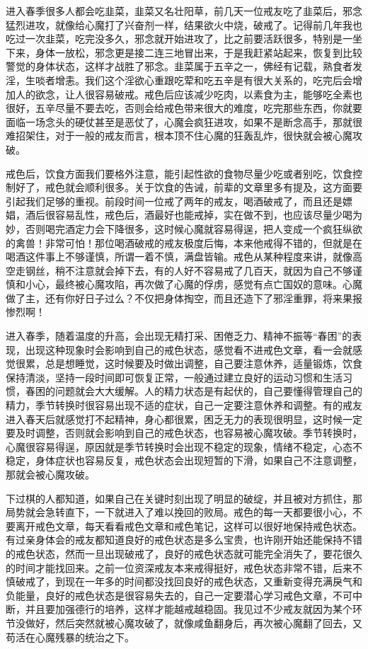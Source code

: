 进入春季很多人都会吃韭菜，韭菜又名壮阳草，前几天一位戒友吃了韭菜后，邪念猛烈进攻，就像给心魔打了兴奋剂一样，结果欲火中烧，破戒了。记得前几年我也吃过一次韭菜，吃完没多久，邪念就开始进攻了，比之前要活跃很多，特别是一坐下来，身体一放松，邪念更是接二连三地冒出来，于是我赶紧站起来，恢复到比较警觉的身体状态，这样才战胜了邪念。韭菜属于五辛之一，佛经有记载，熟食者发淫，生啖者增恚。我们这个淫欲心重跟吃荤和吃五辛是有很大关系的，吃完后会增加人的欲念，让人很容易破戒。戒色后应该减少吃肉，以素食为主，能够吃全素也很好，五辛尽量不要去吃，否则会给戒色带来很大的难度，吃完那些东西，你就要面临一场念头的硬仗甚至是恶仗了，心魔会疯狂进攻，如果不是断念高手，那就很难招架住，对于一般的戒友而言，根本顶不住心魔的狂轰乱炸，很快就会被心魔攻破。

戒色后，饮食方面我们要格外注意，能引起性欲的食物尽量少吃或者别吃，饮食控制好了，戒色就会顺利很多。关于饮食的告诫，前辈的文章里多有提及，这方面要引起我们足够的重视。前段时间一位戒了两年的戒友，喝酒破戒了，而且还是嫖娼，酒后很容易乱性，戒色后，酒最好也能戒掉，实在做不到，也应该尽量少喝为妙，否则喝完酒定力会下降很多，这时候心魔就容易得逞，把人变成一个疯狂纵欲的禽兽！非常可怕！那位喝酒破戒的戒友极度后悔，本来他戒得不错的，但就是在喝酒这件事上不够谨慎，所谓一着不慎，满盘皆输。戒色从某种程度来讲，就像高空走钢丝，稍不注意就会掉下去，有的人好不容易戒了几百天，就因为自己不够谨慎和小心，最终被心魔攻陷，再次做了心魔的俘虏，感觉有点亡国奴的意味。心魔做了主，还有你好日子过么？不仅把身体掏空，而且还造下了邪淫重罪，将来果报惨烈啊！

进入春季，随着温度的升高，会出现无精打采、困倦乏力、精神不振等“春困”的表现，出现这种现象时会影响到自己的戒色状态，感觉看不进戒色文章，看一会就感觉很累，总是想睡觉，这时候要及时做出调整，自己要注意休养，适量锻炼，饮食保持清淡，坚持一段时间即可恢复正常，一般通过建立良好的运动习惯和生活习惯，春困的问题就会大大缓解。人的精力状态是有起伏的，自己要懂得管理自己的精力，季节转换时很容易出现不适的症状，自己一定要注意休养和调整。有的戒友进入春天后就感觉打不起精神，身心都很累，困乏无力的表现很明显，这时候一定要及时调整，否则就会影响到自己的戒色状态，也容易被心魔攻破。季节转换时，心魔很容易得逞，原因就是季节转换时会出现不稳定的现象，情绪不稳定，心态不稳定，身体症状也容易反复，戒色状态会出现短暂的下滑，如果自己不注意调整，那就会被心魔攻破。

下过棋的人都知道，如果自己在关键时刻出现了明显的破绽，并且被对方抓住，那局势就会急转直下，一下就进入了难以挽回的败局。戒色的每一天都要很小心，不要离开戒色文章，每天看看戒色文章和戒色笔记，这样可以很好地保持戒色状态。有过亲身体会的戒友都知道良好的戒色状态是多么宝贵，也许刚开始还能保持不错的戒色状态，然而一旦出现破戒了，良好的戒色状态就可能完全消失了，要花很久的时间才能找回来。之前一位资深戒友本来戒得挺好，戒色状态非常不错，后来不慎破戒了，到现在一年多的时间都没找回良好的戒色状态，又重新变得充满戾气和负能量，良好的戒色状态是很容易失去的，自己一定要潜心学习戒色文章，不可中断，并且要加强德行的培养，这样才能越戒越稳固。我见过不少戒友就因为某个环节没做好，然后突然就被心魔攻破了，就像咸鱼翻身后，再次被心魔翻了回去，又苟活在心魔残暴的统治之下。


